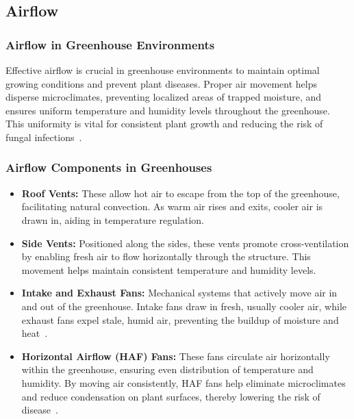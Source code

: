 \subsection{Airflow}

\subsubsection*{Airflow in Greenhouse Environments}

Effective airflow is crucial in greenhouse environments to maintain optimal growing conditions and prevent plant diseases. Proper air movement helps disperse microclimates, preventing localized areas of trapped moisture, and ensures uniform temperature and humidity levels throughout the greenhouse. This uniformity is vital for consistent plant growth and reducing the risk of fungal infections~\citep{pepper_guide}.

\subsubsection*{Airflow Components in Greenhouses}

\begin{itemize}
    \item \textbf{Roof Vents:} These allow hot air to escape from the top of the greenhouse, facilitating natural convection. As warm air rises and exits, cooler air is drawn in, aiding in temperature regulation.

    \item \textbf{Side Vents:} Positioned along the sides, these vents promote cross-ventilation by enabling fresh air to flow horizontally through the structure. This movement helps maintain consistent temperature and humidity levels.

    \item \textbf{Intake and Exhaust Fans:} Mechanical systems that actively move air in and out of the greenhouse. Intake fans draw in fresh, usually cooler air, while exhaust fans expel stale, humid air, preventing the buildup of moisture and heat~\citep{airflow_growersnetwork}.

    \item \textbf{Horizontal Airflow (HAF) Fans:} These fans circulate air horizontally within the greenhouse, ensuring even distribution of temperature and humidity. By moving air consistently, HAF fans help eliminate microclimates and reduce condensation on plant surfaces, thereby lowering the risk of disease~\citep{lopez2013}.
\end{itemize}

